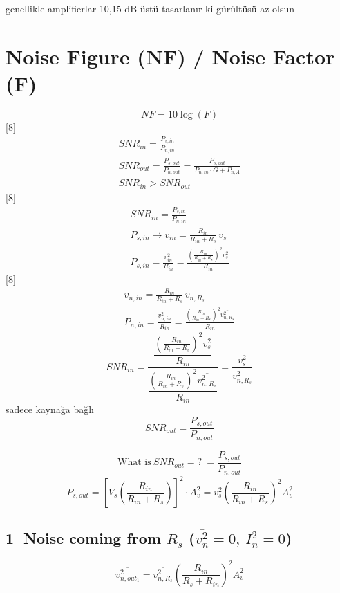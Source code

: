 \documentclass[11pt,a4paper]{article}
\begin{document}
genellikle amplifierlar 10,15 dB üstü tasarlanır ki gürültüsü az olsun

\section{Noise Figure (NF) / Noise Factor (F)}
\[ NF = 10\log(F) \]
[8]
\begin{gather*}
SNR_{in} = \frac{P_{s,in}}{P_{n,in}}\\
SNR_{out} = \frac{P_{s,out}}{P_{n,out}} = \frac{P_{s,out}}{P_{n,in}\cdot G + P_{n,A}}\\
SNR_{in} > SNR_{out}
\end{gather*}
[8]
\begin{gather*}
SNR_{in} = \frac{P_{s,in}}{P_{n,in}}\\
P_{s,in} \to v_{in} = \frac{R_{in}}{R_{in}+R_s}\,v_s\\
P_{s,in} = \frac{v_{in}^2}{R_{in}} = \frac{\left(\frac{R_{in}}{R_{in}+R_s}\right)^2 v_s^2}{R_{in}}
\end{gather*}
[8]
\begin{gather*}
v_{n,in} = \frac{R_{in}}{R_{in}+R_s}\,v_{n,R_s}\\
P_{n,in} = \frac{\overline{v_{n,in}^2}}{R_{in}} = \frac{\left(\frac{R_{in}}{R_{in}+R_s}\right)^2\overline{v_{n,R_s}^2}}{R_{in}}
\end{gather*}
\[ SNR_{in} = \frac{\dfrac{\left(\frac{R_{in}}{R_{in}+R_s}\right)^2 v_s^2}{R_{in}}}{\dfrac{\left(\frac{R_{in}}{R_{in}+R_s}\right)^2\overline{v_{n,R_s}^2}}{R_{in}}} = \frac{v_s^2}{\overline{v_{n,R_s}^2}} \]
sadece kaynağa bağlı
\[ SNR_{out} = \frac{P_{s,out}}{P_{n,out}} \]

\[ \text{What is}\ SNR_{out} = ?\ = \frac{P_{s,out}}{P_{n,out}} \]
\[ P_{s,out} = \left[V_s\left(\frac{R_{in}}{R_{in}+R_s}\right)\right]^2\cdot A_v^2 = v_s^2\left(\frac{R_{in}}{R_{in}+R_s}\right)^2A_v^2 \]
\subsection*{\textcircled{1} Noise coming from $R_s$ ($\overline{v_n^2}=0,\ \overline{I_n^2}=0$)}
\[ \overline{v_{n,out_1}^2} = \overline{v_{n,R_s}^2}\left(\frac{R_{in}}{R_s+R_{in}}\right)^2A_v^2 \]
\end{document}
